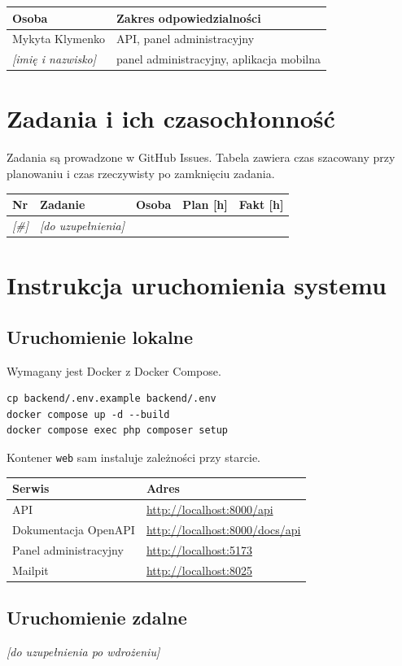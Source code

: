\documentclass[a4paper,12pt]{article}
\begin{document}
\begin{tabularx}{\textwidth}{@{}lX@{}}
  \toprule
  \textbf{Osoba} & \textbf{Zakres odpowiedzialności} \\
  \midrule
  Mykyta Klymenko & API, panel administracyjny \\
  \textit{[imię i nazwisko]} & panel administracyjny, aplikacja mobilna \\
  \bottomrule
\end{tabularx}

\newpage

\section{Zadania i ich czasochłonność}

Zadania są prowadzone w GitHub Issues. Tabela zawiera czas szacowany przy planowaniu i czas
rzeczywisty po zamknięciu zadania.

\begin{longtable}{@{}p{1cm}p{6.4cm}p{3cm}rr@{}}
  \toprule
  \textbf{Nr} & \textbf{Zadanie} & \textbf{Osoba} & \textbf{Plan [h]} & \textbf{Fakt [h]} \\
  \midrule
  \endhead
  \textit{[\#]} & \textit{[do uzupełnienia]} & & & \\
  \bottomrule
\end{longtable}

\newpage

\section{Instrukcja uruchomienia systemu}

\subsection{Uruchomienie lokalne}

Wymagany jest Docker z Docker Compose.

\begin{lstlisting}[style=bash]
cp backend/.env.example backend/.env
docker compose up -d --build
docker compose exec php composer setup
\end{lstlisting}

Kontener \texttt{web} sam instaluje zależności przy starcie.

\begin{tabularx}{\textwidth}{@{}lX@{}}
  \toprule
  \textbf{Serwis} & \textbf{Adres} \\
  \midrule
  API & \url{http://localhost:8000/api} \\
  Dokumentacja OpenAPI & \url{http://localhost:8000/docs/api} \\
  Panel administracyjny & \url{http://localhost:5173} \\
  Mailpit & \url{http://localhost:8025} \\
  \bottomrule
\end{tabularx}

\subsection{Uruchomienie zdalne}

\textit{[do uzupełnienia po wdrożeniu]}
\end{document}

